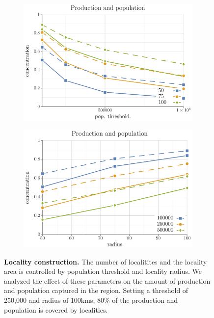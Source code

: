 \documentclass[10pt]{article}
\theoremstyle{definition}
\begin{document}
\begin{figure}[t]
\centering
\begin{subfigure}[b]{.47\textwidth}
    \includegraphics[width=\textwidth]{../cellular_automata/results/cities/concentration_with_popthresh.pdf}
\caption{}
\end{subfigure}
\begin{subfigure}[b]{.47\textwidth}
    \includegraphics[width=\textwidth]{../cellular_automata/results/cities/concentration_with_radius.pdf}
\caption{}
\end{subfigure}
\caption{\textbf{Locality construction.} The number of localitites and the
locality area is controlled by population threshold and locality radius. We
analyzed the effect of these parameters on the amount of production and
population captured in the region. Setting a threshold of 250,000 and
radius of 100kms, 80\% of the production and population is covered by
localities. \label{fig:localityConstruction}}
\end{figure}
\end{document}

